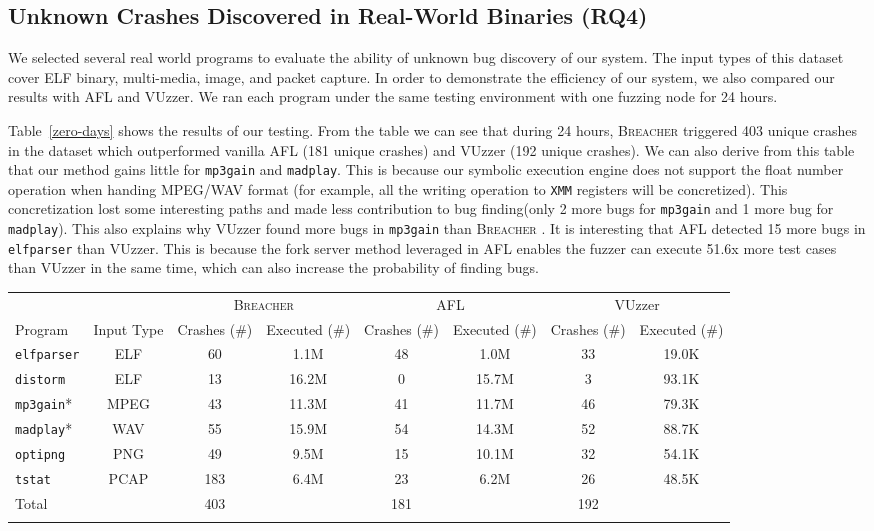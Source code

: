 \documentclass{cta-author}
\newcommand{\prototype}{\textsc{Breacher} }
\begin{document}
\subsection{Unknown Crashes Discovered in Real-World Binaries (RQ4)} \label{sec:RQ4}
We selected several real world programs to evaluate the ability of unknown bug 
discovery of our system. The input types of this dataset cover ELF binary, 
multi-media, image, and packet capture. In order to demonstrate the efficiency 
of our system, we also compared our results with AFL and VUzzer. We ran each
program under the same testing environment with one fuzzing node for 24 hours. 

Table~\ref{zero-days} shows the results of our testing. 
From the table we can see that during 24 hours, \prototype triggered 403 
unique crashes in the dataset which outperformed vanilla AFL (181 unique crashes) 
and VUzzer (192 unique crashes). 
We can also derive from this table that our method gains little for \texttt{mp3gain} 
and \texttt{madplay}. This is because our symbolic execution engine does not support 
the float number operation when handing MPEG/WAV format (for example, all the 
writing operation to \texttt{XMM} registers will be concretized). This concretization 
lost some interesting paths and made less contribution to bug finding(only 2 more 
bugs for \texttt{mp3gain} and 1 more bug for \texttt{madplay}). 
This also explains why VUzzer found more bugs in \texttt{mp3gain} 
than \prototype. 
It is interesting that AFL detected 15 more bugs in \texttt{elfparser} than VUzzer. 
This is because the fork server method leveraged in AFL enables the fuzzer can 
execute 51.6x more test cases than VUzzer in the same time, which can also increase 
the probability of finding bugs.
		
\begin{table}[!t]
	{\begin{tabular}{lccccccc}\toprule
			& & \multicolumn{2}{c}{\prototype} & \multicolumn{2}{c}{AFL} & \multicolumn{2}{c}{VUzzer}\\
			Program & Input Type & Crashes (\#) & Executed (\#)& 
			Crashes (\#) & Executed  (\#) & Crashes (\#) & Executed (\#) \\
			\midrule
			\texttt{elfparser}  & ELF	& 60 &   1.1M & 48   & 1.0M   & 33 & 19.0K    \\
			\texttt{distorm}    & ELF    & 13 &   16.2M   & 0   & 15.7M    & 3 & 93.1K    \\
			\texttt{mp3gain}*   & MPEG	& 43 &   11.3M  & 41  &  11.7M   & 46 &  79.3K  \\
			\texttt{madplay}*   & WAV	& 55 &   15.9M  & 54  & 14.3M    & 52 & 88.7K   \\
			\texttt{optipng}    & PNG    & 49 &   9.5M & 15  &  10.1M   & 32 & 54.1K   \\
			\texttt{tstat}      & PCAP   & 183&   6.4M & 23 &  6.2M   & 26 & 48.5K   \\
			\midrule
			Total      &        & 403   &  & 181 &  & 192 &\\
			\botrule
		\end{tabular}}{}
	\end{table}
\end{document}
